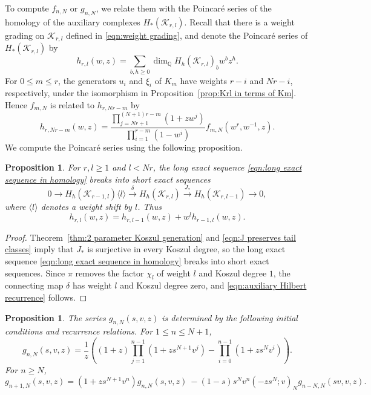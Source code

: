 \documentclass[reqno]{amsart}
\newtheorem{prop}[thm]{Proposition}
\theoremstyle{definition}
\theoremstyle{remark}
\newcommand{\QQ}{\mathbb{Q}}
\newcommand{\cak}{\mathcal{K}}
\DeclareMathOperator{\dimm}{dim}
\begin{document}
To compute $f_{n,N}$ or $g_{n,N}$, we relate them with the Poincar\'e series of the homology of the auxiliary complexes $H_*(\cak_{r,l})$. Recall that there is a weight grading on $\cak_{r,l}$ defined in \eqref{eqn:weight grading}, and denote the Poincar\'e series of $H_*(\cak_{r,l})$ by
\[h_{r,l}(w,z)=\sum_{b,h\ge0}\dimm_{\QQ}H_h(\cak_{r,l})_bw^bz^h.\]For $0\le m\le r$, the generators $u_i$ and $\xi_i$ of $K_m$ have weights $r-i$ and $Nr-i$, respectively, under the isomorphism in Proposition~\ref{prop:Krl in terms of Km}. Hence $f_{m,N}$ is related to $h_{r,Nr-m}$ by
\begin{equation}\label{eqn:Hilbert reversal}
h_{r,Nr-m}(w,z)=\frac{\prod_{j=Nr+1}^{(N+1)r-m}(1+zw^j)}{\prod_{i=1}^{r-m}(1-w^i)}f_{m,N}(w^r,w^{-1},z).
\end{equation}We compute the Poincar\'e series using the following proposition.

\begin{prop}
For $r,l\ge1$ and $l<Nr$, the long exact sequence \eqref{eqn:long exact sequence in homology} breaks into short exact sequences
\[0\to H_h(\cak_{r-1,l})\langle l\rangle\xrightarrow{\delta}H_h(\cak_{r,l})\xrightarrow{J_*}H_h(\cak_{r,l-1})\to0,\]
where $\langle l\rangle$ denotes a weight shift by $l$. Thus
\begin{equation}\label{eqn:auxiliary Hilbert recurrence}
h_{r,l}(w,z)=h_{r,l-1}(w,z)+w^lh_{r-1,l}(w,z).
\end{equation}
\end{prop}

\begin{proof}
Theorem~\ref{thm:2 parameter Koszul generation} and \eqref{eqn:J preserves tail classes} imply that $J_*$ is surjective in every Koszul degree, so the long exact sequence \eqref{eqn:long exact sequence in homology} breaks into short exact sequences. Since $\pi$ removes the factor $\chi_l$ of weight $l$ and Koszul degree $1$, the connecting map $\delta$ has weight $l$ and Koszul degree zero, and \eqref{eqn:auxiliary Hilbert recurrence} follows.
\end{proof}

\begin{prop}The series $g_{n,N}(s,v,z)$  is determined by the following initial conditions and recurrence relations.
For $1\le n\le N+1$,
\begin{equation}\label{eqn:initial Hilbert numerators}
g_{n,N}(s,v,z)=\frac{1}{z}\left((1+z)\prod_{j=1}^{n-1}(1+zs^{N+1}v^j)-\prod_{i=0}^{n-1}(1+zs^Nv^i)\right).
\end{equation}
For $n\ge N$,
\begin{equation}\label{eqn:Hilbert numerator recurrence}
g_{n+1,N}(s,v,z)=(1+zs^{N+1}v^n)g_{n,N}(s,v,z) \ -(1-s)s^Nv^n(-zs^N;v)_Ng_{n-N,N}(sv,v,z).
\end{equation}
\end{prop}
\end{document}
